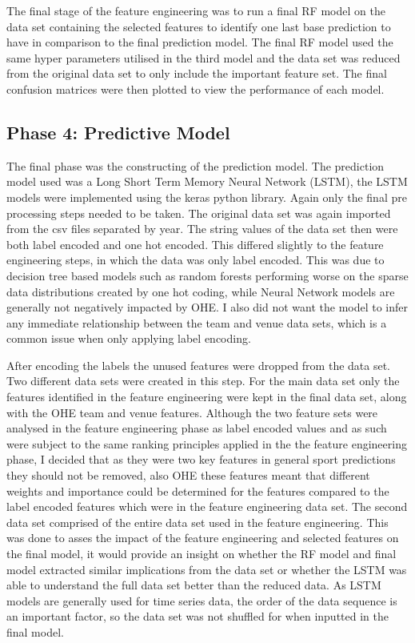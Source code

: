 \documentclass{imc-inf}
\begin{document}
	The final stage of the feature engineering was to run a final RF model on the data set containing the selected features to identify one last base prediction to have in comparison to the final prediction model. The final RF model used the same hyper parameters utilised in the third model and the data set was reduced from the original data set to only include the important feature set.
	The final confusion matrices were then plotted to view the performance of each model.
		
	\subsection{Phase 4: Predictive Model}
	The final phase was the constructing of the prediction model. The prediction model used was a Long Short Term Memory Neural Network (LSTM), the LSTM models were implemented using the keras python library. Again only the final pre processing steps needed to be taken. The original data set was again imported from the csv files separated by year. The string values of the data set then were both label encoded and one hot encoded. This differed slightly to the feature engineering steps, in which the data was only label encoded. This was due to decision tree based models such as random forests performing worse on the sparse data distributions created by one hot coding, while Neural Network models are generally not negatively impacted by OHE. I also did not want the model to infer any immediate relationship between the team and venue data sets, which is a common issue when only applying label encoding. 
	\newline
	
	After encoding the labels the unused features were dropped from the data set. Two different data sets were created in this step. For the main data set only the features identified in the feature engineering were kept in the final data set, along with the OHE team and venue features. Although the two feature sets were analysed in the feature engineering phase as label encoded values and as such were subject to the same ranking principles applied in the the feature engineering phase, I decided that as they were two key features in general sport predictions they should not be removed, also OHE these features meant that different weights and importance could be determined for the features compared to the label encoded features which were in the feature engineering data set. The second data set comprised of the entire data set used in the feature engineering. This was done to asses the impact of the feature engineering and selected features on the final model, it would provide an insight on whether the RF model and final model extracted similar implications from the data set or whether the LSTM was able to understand the full data set better than the reduced data. As LSTM models are generally used for time series data, the order of the data sequence is an important factor, so the data set was not shuffled for when inputted in the final model.  	
	\newline
	
\end{document}

